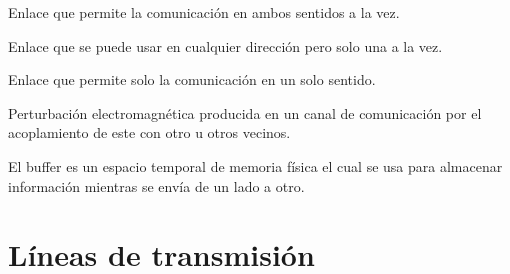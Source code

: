 \documentclass[
	12pt, %
	fleqn, %
	a4paper, %
]{LegrandOrangeBook}
\begin{document}
\begin{vocabulary}
Enlace que permite la comunicación en ambos sentidos a la vez.
\end{vocabulary}
\begin{vocabulary}
Enlace que se puede usar en cualquier dirección pero solo una a la vez.
\end{vocabulary}
\begin{vocabulary}[Simplex]
Enlace que permite solo la comunicación en un solo sentido.
\end{vocabulary}
\begin{vocabulary}[Diafonía]
Perturbación electromagnética producida en un canal de comunicación por el acoplamiento de este con otro u otros vecinos.
\end{vocabulary}
\begin{vocabulary}[Buffer]
El buffer es un espacio temporal de memoria física el cual se usa para almacenar información mientras se envía de un lado a otro.
\end{vocabulary}
\part{Líneas de transmisión}
\end{document}

